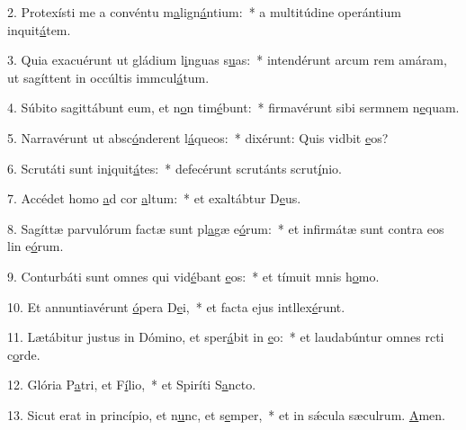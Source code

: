 2. Protexísti me a convéntu m\uline{a}lign\uline{á}ntium:~* a multitúdine operántium inquit\uline{á}tem.\par 
3. Quia exacuérunt ut gládium l\uline{i}nguas s\uline{u}as:~* intendérunt arcum rem amáram, ut sagíttent in occúltis immcul\uline{á}tum.\par 
4. Súbito sagittábunt eum, et n\uline{o}n tim\uline{é}bunt:~* firmavérunt sibi sermnem n\uline{e}quam.\par 
5. Narravérunt ut absc\uline{ó}nderent l\uline{á}queos:~* dixérunt: Quis vidbit \uline{e}os?\par 
6. Scrutáti sunt in\uline{i}quit\uline{á}tes:~* defecérunt scrutánts scrut\uline{í}nio.\par 
7. Accédet homo \uline{a}d cor \uline{a}ltum:~* et exaltábtur D\uline{e}us.\par 
8. Sagíttæ parvulórum factæ sunt pl\uline{a}gæ e\uline{ó}rum:~* et infirmátæ sunt contra eos lin e\uline{ó}rum.\par 
9. Conturbáti sunt omnes qui vid\uline{é}bant \uline{e}os:~* et tímuit mnis h\uline{o}mo.\par 
10. Et annuntiavérunt \uline{ó}pera D\uline{e}i,~* et facta ejus intllex\uline{é}runt.\par 
11. Lætábitur justus in Dómino, et sper\uline{á}bit in \uline{e}o:~* et laudabúntur omnes rcti c\uline{o}rde.\par 
12. Glória P\uline{a}tri, et F\uline{í}lio,~* et Spiríti S\uline{a}ncto.\par 
13. Sicut erat in princípio, et n\uline{u}nc, et s\uline{e}mper,~* et in sǽcula sæculrum. \uline{A}men.\par 
